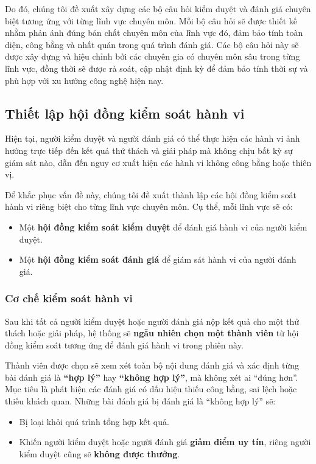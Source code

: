 Do đó, chúng tôi đề xuất xây dựng các bộ câu hỏi kiểm duyệt và đánh giá chuyên biệt tương ứng với từng lĩnh vực chuyên môn. Mỗi bộ câu hỏi sẽ được thiết kế nhằm phản ánh đúng bản chất chuyên môn của lĩnh vực đó, đảm bảo tính toàn diện, công bằng và nhất quán trong quá trình đánh giá.
Các bộ câu hỏi này sẽ được xây dựng và hiệu chỉnh bởi các chuyên gia có chuyên môn sâu trong từng lĩnh vực, đồng thời sẽ được rà soát, cập nhật định kỳ để đảm bảo tính thời sự và phù hợp với xu hướng công nghệ hiện nay.

\subsection{Thiết lập hội đồng kiểm soát hành vi}

Hiện tại, người kiểm duyệt và người đánh giá có thể thực hiện các hành vi ảnh hưởng trực tiếp đến kết quả thử thách và giải pháp mà không chịu bất kỳ sự giám sát nào, dẫn đến nguy cơ xuất hiện các hành vi không công bằng hoặc thiên vị.

Để khắc phục vấn đề này, chúng tôi đề xuất thành lập các hội đồng kiểm soát hành vi riêng biệt cho từng lĩnh vực chuyên môn. Cụ thể, mỗi lĩnh vực sẽ có:
\begin{itemize}
  \item Một \textbf{hội đồng kiểm soát kiểm duyệt} để đánh giá hành vi của người kiểm duyệt.
  \item Một \textbf{hội đồng kiểm soát đánh giá} để giám sát hành vi của người đánh giá.
\end{itemize}

\subsubsection{Cơ chế kiểm soát hành vi}

Sau khi tất cả người kiểm duyệt hoặc người đánh giá nộp kết quả cho một thử thách hoặc giải pháp, hệ thống sẽ \textbf{ngẫu nhiên chọn một thành viên} từ hội đồng kiểm soát tương ứng để đánh giá hành vi trong phiên này.

Thành viên được chọn sẽ xem xét toàn bộ nội dung đánh giá và xác định từng bài đánh giá là \textbf{``hợp lý''} hay \textbf{``không hợp lý''}, mà không xét ai ``đúng hơn''.
Mục tiêu là phát hiện các đánh giá có dấu hiệu thiếu công bằng, sai lệch hoặc thiếu khách quan.
Những bài đánh giá bị đánh giá là ``không hợp lý'' sẽ:
\begin{itemize}
  \item Bị loại khỏi quá trình tổng hợp kết quả.
  \item Khiến người kiểm duyệt hoặc người đánh giá \textbf{giảm điểm uy tín}, riêng người kiểm duyệt cũng sẽ \textbf{không được thưởng}.
\end{itemize}

